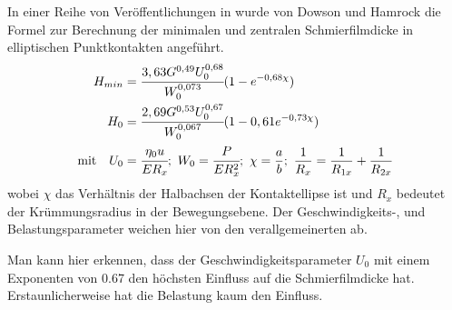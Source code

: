 In einer Reihe von Veröffentlichungen in \cite{hamrock_dowson_1976_a}\cite{hamrock_dowson_1976_b}\cite{hamrock_dowson_1977_a}\cite{hamrock_dowson_1977_b} wurde von Dowson und Hamrock die Formel zur Berechnung der minimalen und zentralen Schmierfilmdicke in elliptischen Punktkontakten angeführt.
\begin{align}
    \label{eq:mininmale_schmierfilmdicke_downson_hamrock}
    H_{min} &= \cfrac{3,63 G^{0,49} U_0^{0,68}}{W_0^{0,073}} (1 - e^{-0,68 \chi}) \\
    \label{eq:zentrale_schmierfilmdicke_downson_hamrock}
    H_0 &= \cfrac{2,69 G^{0,53} U_0^{0,67}}{W_0^{0,067}} (1 - 0,61 e^{-0,73 \chi}) \\
    \text{mit} \quad
    U_0 &= \cfrac{\eta_0 u}{E R_x};\ 
    W_0 = \cfrac{P}{E R_x^2};\
    \chi = \frac{a}{b};\
    \frac{1}{R_x} = \frac{1}{R_{1x}} + \frac{1}{R_{2x}} \nonumber 
\end{align}
%
wobei $\chi$ das Verhältnis der Halbachsen der Kontaktellipse ist und $R_x$ bedeutet der Krümmungsradius in der Bewegungsebene.
Der Geschwindigkeits-, und Belastungsparameter weichen hier von den verallgemeinerten ab.

Man kann hier erkennen, dass der Geschwindigkeitsparameter $U_0$ mit einem Exponenten von \num{0.67} den höchsten Einfluss auf die Schmierfilmdicke hat.
Erstaunlicherweise hat die Belastung kaum den Einfluss.
